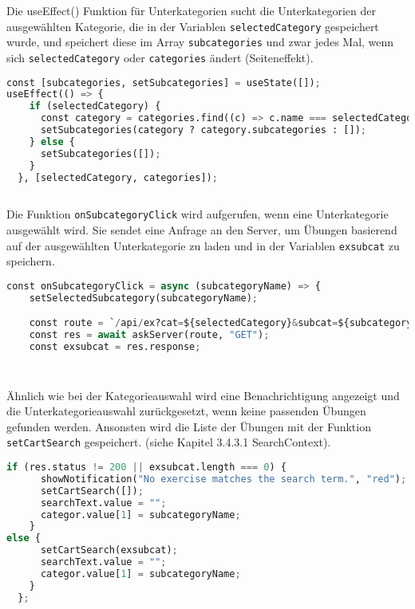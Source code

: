 Die useEffect() Funktion für Unterkategorien sucht die Unterkategorien der ausgewählten Kategorie, die in der Variablen \texttt{selectedCategory} gespeichert wurde, und speichert diese im Array \texttt{subcategories} und zwar jedes Mal, wenn sich \texttt{selectedCategory} oder \texttt{categories} ändert (Seiteneffekt). 


\begin{lstlisting}[language=Python]
const [subcategories, setSubcategories] = useState([]);
useEffect(() => {
    if (selectedCategory) {
      const category = categories.find((c) => c.name === selectedCategory);
      setSubcategories(category ? category.subcategories : []);
    } else {
      setSubcategories([]);
    }
  }, [selectedCategory, categories]);
      
\end{lstlisting}



Die Funktion \texttt{onSubcategoryClick} wird aufgerufen, wenn eine Unterkategorie ausgewählt wird. Sie sendet eine Anfrage an den Server, um Übungen basierend auf der ausgewählten Unterkategorie zu laden und in der Variablen \texttt{exsubcat} zu speichern.

\begin{lstlisting}[language=Python]
const onSubcategoryClick = async (subcategoryName) => {
    setSelectedSubcategory(subcategoryName);

    const route = `/api/ex?cat=${selectedCategory}&subcat=${subcategoryName}`;
    const res = await askServer(route, "GET");
    const exsubcat = res.response;
    
    
\end{lstlisting}

 Ähnlich wie bei der Kategorieauswahl wird eine Benachrichtigung angezeigt und die Unterkategorieauswahl zurückgesetzt, wenn keine passenden Übungen gefunden werden. Ansonsten wird die Liste der Übungen mit der Funktion \texttt{setCartSearch} gespeichert. (siehe Kapitel 3.4.3.1 SearchContext).


\begin{lstlisting}[language=Python]
if (res.status != 200 || exsubcat.length === 0) {
      showNotification("No exercise matches the search term.", "red");
      setCartSearch([]);
      searchText.value = "";
      categor.value[1] = subcategoryName;
    }
else {
      setCartSearch(exsubcat);
      searchText.value = "";
      categor.value[1] = subcategoryName;
    }
  };
\end{lstlisting}